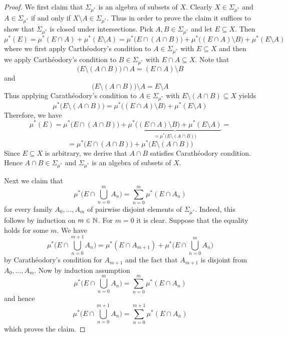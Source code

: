 \begin{proof}
    We first claim that $\Sigma_{\mu^*}$ is an algebra of subsets of $X$. Clearly $X \in \Sigma_{\mu^*}$ and $A \in \Sigma_{\mu^*}$ if and only if $X\setminus A \in \Sigma_{\mu^*}$. Thus in order to prove the claim it suffices to show that $\Sigma_{\mu^*}$ is closed under intersections. Pick $A,B\in \Sigma_{\mu^*}$ and let $E \subseteq X$. Then
    $$\mu^*(E) = \mu^*(E\cap A) + \mu^*(E\setminus A) = \mu^*\big(E\cap (A\cap B)\big) + \mu^*\big((E\cap A) \setminus B\big) + \mu^*(E\setminus A)$$
    where we first apply Carth{\'e}odory's condition to $A \in \Sigma_{\mu^*}$ with $E\subseteq X$ and then we apply Carth{\'e}odory's condition to $B\in \Sigma_{\mu^*}$ with $E\cap A\subseteq X$. Note that
    $$\big(E\setminus (A \cap B)\big)\cap A = (E\cap A) \setminus B$$
    and
    $$\big(E\setminus (A\cap B)\big)\setminus A = E\setminus A$$
    Thus applying Carath{\'e}odory's condition to $A\in \Sigma_{\mu^*}$ with $E\setminus (A\cap B)\subseteq X$ yields
    $$\mu^*\big(E\setminus (A\cap B)\big) = \mu^*\big((E\cap A) \setminus B\big) + \mu^*(E\setminus A)$$
    Therefore, we have
    $$\mu^*(E) = \mu^*\big(E\cap (A\cap B)\big) + \underbrace{\mu^*\big((E\cap A) \setminus B\big) + \mu^*(E\setminus A)}_{=\mu^*\big(E\setminus (A\cap B)\big)} = $$
    $$=\mu^*\big(E\cap (A\cap B)\big) + \mu^*\big(E\setminus (A\cap B)\big)$$
    Since $E\subseteq X$ is arbitrary, we derive that $A\cap B$ satisfies Carath{\'e}odory condition. Hence $A\cap B \in \Sigma_{\mu^*}$ and $\Sigma_{\mu^*}$ is an algebra of subsets of $X$.

    Next we claim that
    $$\mu^*\bigg(E\cap \bigcup_{n=0}^mA_n\bigg) = \sum_{n=0}^m\mu^*(E\cap A_n)$$
    for every family $A_0,...,A_m$ of pairwise disjoint elements of $\Sigma_{\mu^*}$. Indeed, this follows by induction on $m \in {\mathbb N}$. For $m = 0$ it is clear. Suppose that the equality holds for some $m$. We have
    $$\mu^*\bigg(E\cap \bigcup_{n=0}^{m+1}A_n\bigg) = \mu^*(E\cap A_{m+1}) + \mu^*\bigg(E\cap \bigcup_{n=0}^mA_n\bigg)
    $$
    by Carath{\'e}odory's condition for $A_{m+1}$ and the fact that $A_{m+1}$ is disjoint from $A_0,...,A_m$. Now by induction assumption
    $$\mu^*\bigg(E\cap \bigcup_{n=0}^mA_n\bigg) = \sum_{n=0}^m\mu^*(E\cap A_n)$$
    and hence
    $$\mu^*\bigg(E\cap \bigcup_{n=0}^{m+1}A_n\bigg) = \sum_{n=0}^{m+1}\mu^*(E\cap A_n)$$
    which proves the claim.
    

\end{proof}
